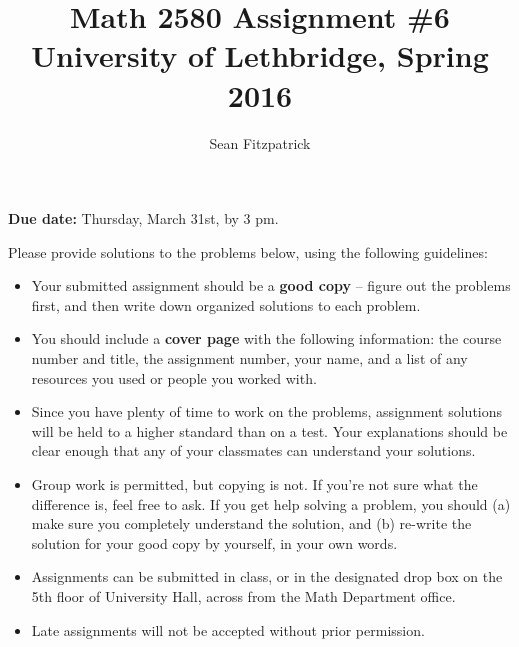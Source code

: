 \documentclass[letterpaper,12pt]{article}
\title{Math 2580 Assignment \#6\\University of Lethbridge, Spring 2016}
\author{Sean Fitzpatrick}
\begin{document}
 \maketitle

{\bf Due date:} Thursday, March 31st, by 3 pm.

\bigskip

Please provide solutions to the problems below, using the following guidelines:
\begin{itemize}
\item Your submitted assignment should be a {\bf good copy} -- figure out the problems first, and then write down organized solutions to each problem. 
\item You should include a {\bf cover page} with the following information: the course number and title, the assignment number, your name, and a list of any resources you used or people you worked with.
\item Since you have plenty of time to work on the problems, assignment solutions will be held to a higher standard than on a test. Your explanations should be clear enough that any of your classmates can understand your solutions.
\item Group work is permitted, but copying is not. If you're not sure what the difference is, feel free to ask. If you get help solving a problem, you should (a) make sure you completely understand the solution, and (b) re-write the solution for your good copy by yourself, in your own words.
\item Assignments can be submitted in class, or in the designated drop box on the 5th floor of University Hall, across from the Math Department office.
\item Late assignments will not be accepted without prior permission.

\end{itemize}
\newpage
\end{document}
